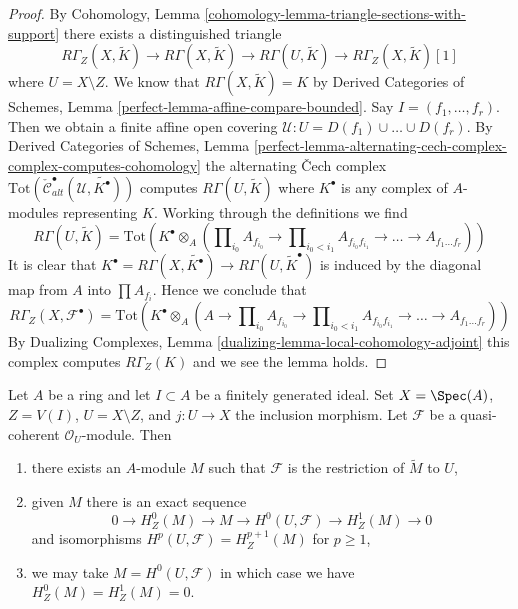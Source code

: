 \begin{proof}
By Cohomology, Lemma \ref{cohomology-lemma-triangle-sections-with-support}
there exists a distinguished triangle
$$
R\Gamma_Z(X, \widetilde{K})
\to R\Gamma(X, \widetilde{K})
\to R\Gamma(U, \widetilde{K})
\to R\Gamma_Z(X, \widetilde{K})[1]
$$
where $U = X \setminus Z$. We know that $R\Gamma(X, \widetilde{K}) = K$
by Derived Categories of Schemes, Lemma
\ref{perfect-lemma-affine-compare-bounded}.
Say $I = (f_1, \ldots, f_r)$. Then we obtain a finite affine
open covering $\mathcal{U} : U = D(f_1) \cup \ldots \cup D(f_r)$.
By Derived Categories of Schemes, Lemma
\ref{perfect-lemma-alternating-cech-complex-complex-computes-cohomology}
the alternating {\v C}ech complex
$\text{Tot}(\check{\mathcal{C}}_{alt}^\bullet(\mathcal{U},
\widetilde{K^\bullet}))$
computes $R\Gamma(U, \widetilde{K})$ where $K^\bullet$ is any
complex of $A$-modules representing $K$. Working through the
definitions we find
$$
R\Gamma(U, \widetilde{K}) =
\text{Tot}\left(
K^\bullet \otimes_A
(\prod\nolimits_{i_0} A_{f_{i_0}} \to
\prod\nolimits_{i_0 < i_1} A_{f_{i_0}f_{i_1}} \to
\ldots \to A_{f_1\ldots f_r})\right)
$$
It is clear that
$K^\bullet = R\Gamma(X, \widetilde{K^\bullet}) \to
R\Gamma(U, \widetilde{K}^\bullet)$
is induced by the diagonal map from $A$ into $\prod A_{f_i}$.
Hence we conclude that
$$
R\Gamma_Z(X, \mathcal{F}^\bullet) =
\text{Tot}\left(
K^\bullet \otimes_A
(A \to \prod\nolimits_{i_0} A_{f_{i_0}} \to
\prod\nolimits_{i_0 < i_1} A_{f_{i_0}f_{i_1}} \to
\ldots \to A_{f_1\ldots f_r})\right)
$$
By Dualizing Complexes, Lemma \ref{dualizing-lemma-local-cohomology-adjoint}
this complex computes $R\Gamma_Z(K)$ and we see the lemma holds.
\end{proof}

\begin{lemma}
\label{lemma-local-cohomology}
Let $A$ be a ring and let $I \subset A$ be a finitely generated ideal.
Set $X = \Spec(A)$, $Z = V(I)$, $U = X \setminus Z$, and $j : U \to X$
the inclusion morphism. Let $\mathcal{F}$ be a quasi-coherent
$\mathcal{O}_U$-module. Then
\begin{enumerate}
\item there exists an $A$-module $M$ such that $\mathcal{F}$ is the
restriction of $\widetilde{M}$ to $U$,
\item given $M$ there is an exact sequence
$$
0 \to H^0_Z(M) \to M \to H^0(U, \mathcal{F}) \to H^1_Z(M) \to 0
$$
and isomorphisms $H^p(U, \mathcal{F}) = H^{p + 1}_Z(M)$ for $p \geq 1$,
\item we may take $M = H^0(U, \mathcal{F})$ in which case
we have $H^0_Z(M) = H^1_Z(M) = 0$.
\end{enumerate}
\end{lemma}

